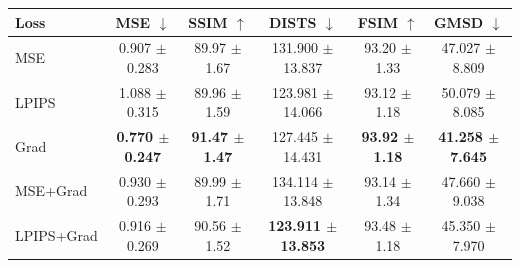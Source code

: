 \begin{tabular}{lccccc}
\hline
Loss & MSE $\downarrow$ & SSIM $\uparrow$ & DISTS $\downarrow$ & FSIM $\uparrow$ & GMSD $\downarrow$ \\
\hline
MSE & 0.907 $\pm$ 0.283 & 89.97 $\pm$ 1.67 & 131.900 $\pm$ 13.837 & 93.20 $\pm$ 1.33 & 47.027 $\pm$ 8.809 \\
LPIPS & 1.088 $\pm$ 0.315 & 89.96 $\pm$ 1.59 & 123.981 $\pm$ 14.066 & 93.12 $\pm$ 1.18 & 50.079 $\pm$ 8.085 \\
Grad & \textbf{0.770 $\pm$ 0.247} & \textbf{91.47 $\pm$ 1.47} & 127.445 $\pm$ 14.431 & \textbf{93.92 $\pm$ 1.18} & \textbf{41.258 $\pm$ 7.645} \\
MSE+Grad & 0.930 $\pm$ 0.293 & 89.99 $\pm$ 1.71 & 134.114 $\pm$ 13.848 & 93.14 $\pm$ 1.34 & 47.660 $\pm$ 9.038 \\
LPIPS+Grad & 0.916 $\pm$ 0.269 & 90.56 $\pm$ 1.52 & \textbf{123.911 $\pm$ 13.853} & 93.48 $\pm$ 1.18 & 45.350 $\pm$ 7.970 \\
\hline
\end{tabular}
